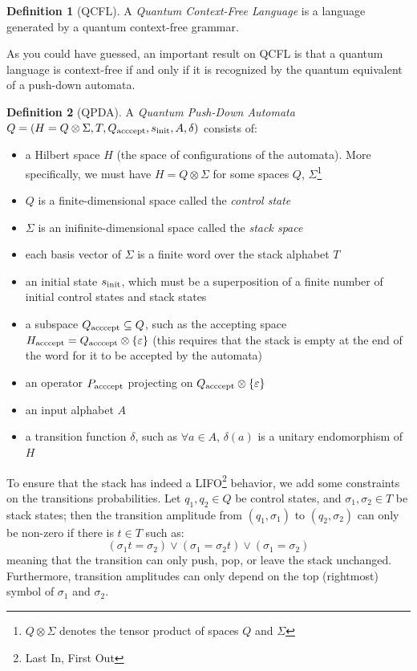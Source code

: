 \documentclass[12pt,a4paper]{article}
\theoremstyle{plain}
\theoremstyle{definition}
\newtheorem*{definition}{Definition}
\begin{document}
\begin{definition}[QCFL]
    A \emph{Quantum Context-Free Language} is a language generated by a quantum context-free grammar.
\end{definition}

As you could have guessed, an important result on QCFL is that a quantum language is context-free if and only if it is recognized by the quantum equivalent of a push-down automata.

\begin{definition}[QPDA]
    A \emph{Quantum Push-Down Automata} $Q=(H=Q\otimes \Sigma, T, Q_{\textnormal{acccept}}, s_{\textnormal{init}}, A, \delta)$ consists of:
    \begin{itemize}[label=--, noitemsep]
        \item a Hilbert space $H$ (the space of configurations of the automata). More specifically, we must have $H=Q\otimes \Sigma$ for some spaces $Q$, $\Sigma$\footnote{$Q\otimes \Sigma$ denotes the tensor product of spaces $Q$ and $\Sigma$}
        \item $Q$ is a finite-dimensional space called the \emph{control state}
        \item $\Sigma$ is an inifinite-dimensional space called the \emph{stack space}
        \item each basis vector of $\Sigma$ is a finite word over the stack alphabet $T$
        \item an initial state $s_{\textnormal{init}}$, which must be a superposition of a finite number of initial control states and stack states
        \item a subspace $Q_{\textnormal{acccept}} \subseteq Q$, such as the accepting space $H_{\textnormal{acccept}}=Q_{\textnormal{acccept}}\otimes \{\varepsilon\}$ (this requires that the stack is empty at the end of the word for it to be accepted by the automata)
        \item an operator $P_{\textnormal{acccept}}$ projecting on $Q_{\textnormal{acccept}}\otimes \{\varepsilon\}$
        \item an input alphabet $A$
        \item a transition function $\delta$, such as $\forall a\in A$, $\delta(a)$ is a unitary endomorphism of $H$
    \end{itemize}

    To ensure that the stack has indeed a LIFO\footnote{Last In, First Out} behavior, we add some constraints on the transitions probabilities. Let $q_1, q_2\in Q$ be control states, and $\sigma_1, \sigma_2\in T$ be stack states; then the transition amplitude from $(q_1, \sigma_1)$ to $(q_2, \sigma_2)$ can only be non-zero if there is $t\in T$ such as:
    \begin{equation*}
        (\sigma_1t = \sigma_2) \lor (\sigma_1 = \sigma_2t) \lor (\sigma_1 = \sigma_2)
    \end{equation*}
    meaning that the transition can only push, pop, or leave the stack unchanged. Furthermore, transition amplitudes can only depend on the top (rightmost) symbol of $\sigma_1$ and $\sigma_2$.
\end{definition}
\end{document}
